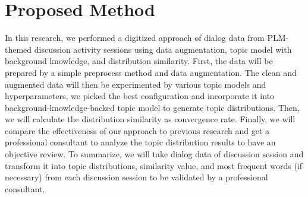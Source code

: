 \documentclass[10pt, conference, compsocconf]{IEEEtran}
\begin{document}



\section{Proposed Method}
\label{sec_pm}
In this research, we performed a digitized approach of dialog data from PLM-themed discussion activity sessions using data augmentation, topic model with background knowledge, and distribution similarity. First, the data will be prepared by a simple preprocess method and data augmentation. The clean and augmented data will then be experimented by various topic models and hyperparameters, we picked the best configuration and incorporate it into background-knowledge-backed topic model to generate topic distributions. Then, we will calculate the distribution similarity as convergence rate. Finally, we will compare the effectiveness of our approach to previous research and get a professional consultant to analyze the topic distribution results to have an objective review. To summarize, we will take dialog data of discussion session and transform it into topic distributions, similarity value, and most frequent words (if necessary) from each discussion session to be validated by a professional consultant.
\end{document}
